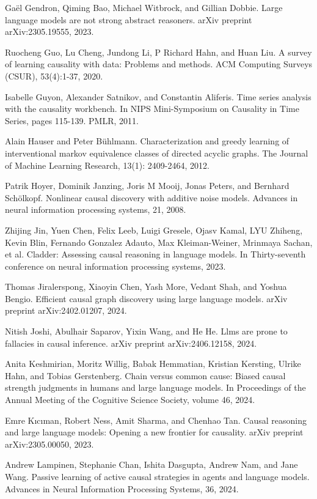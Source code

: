 \documentclass[10pt]{article}
\begin{document}
Gaël Gendron, Qiming Bao, Michael Witbrock, and Gillian Dobbie. Large language models are not strong abstract reasoners. arXiv preprint arXiv:2305.19555, 2023.

Ruocheng Guo, Lu Cheng, Jundong Li, P Richard Hahn, and Huan Liu. A survey of learning causality with data: Problems and methods. ACM Computing Surveys (CSUR), 53(4):1-37, 2020.

Isabelle Guyon, Alexander Satnikov, and Constantin Aliferis. Time series analysis with the causality workbench. In NIPS Mini-Symposium on Causality in Time Series, pages 115-139. PMLR, 2011.

Alain Hauser and Peter Bühlmann. Characterization and greedy learning of interventional markov equivalence classes of directed acyclic graphs. The Journal of Machine Learning Research, 13(1): 2409-2464, 2012.

Patrik Hoyer, Dominik Janzing, Joris M Mooij, Jonas Peters, and Bernhard Schölkopf. Nonlinear causal discovery with additive noise models. Advances in neural information processing systems, 21, 2008.

Zhijing Jin, Yuen Chen, Felix Leeb, Luigi Gresele, Ojasv Kamal, LYU Zhiheng, Kevin Blin, Fernando Gonzalez Adauto, Max Kleiman-Weiner, Mrinmaya Sachan, et al. Cladder: Assessing causal reasoning in language models. In Thirty-seventh conference on neural information processing systems, 2023.

Thomas Jiralerspong, Xiaoyin Chen, Yash More, Vedant Shah, and Yoshua Bengio. Efficient causal graph discovery using large language models. arXiv preprint arXiv:2402.01207, 2024.

Nitish Joshi, Abulhair Saparov, Yixin Wang, and He He. Llms are prone to fallacies in causal inference. arXiv preprint arXiv:2406.12158, 2024.

Anita Keshmirian, Moritz Willig, Babak Hemmatian, Kristian Kersting, Ulrike Hahn, and Tobias Gerstenberg. Chain versus common cause: Biased causal strength judgments in humans and large language models. In Proceedings of the Annual Meeting of the Cognitive Science Society, volume 46, 2024.

Emre Kıcıman, Robert Ness, Amit Sharma, and Chenhao Tan. Causal reasoning and large language models: Opening a new frontier for causality. arXiv preprint arXiv:2305.00050, 2023.

Andrew Lampinen, Stephanie Chan, Ishita Dasgupta, Andrew Nam, and Jane Wang. Passive learning of active causal strategies in agents and language models. Advances in Neural Information Processing Systems, 36, 2024.
\end{document}
